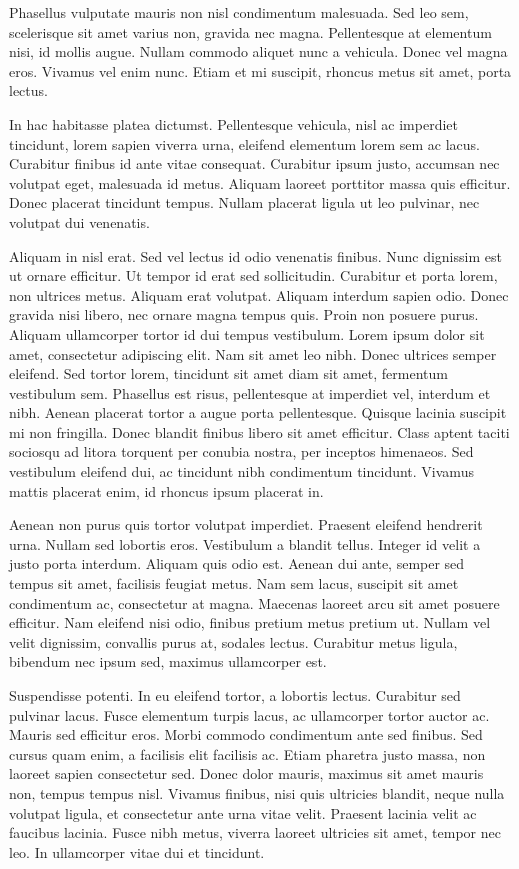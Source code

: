 \documentclass{article}
\begin{document}
Phasellus vulputate mauris non nisl condimentum malesuada. Sed leo sem, scelerisque sit amet varius non, gravida nec magna. Pellentesque at elementum nisi, id mollis augue. Nullam commodo aliquet nunc a vehicula. Donec vel magna eros. Vivamus vel enim nunc. Etiam et mi suscipit, rhoncus metus sit amet, porta lectus.

In hac habitasse platea dictumst. Pellentesque vehicula, nisl ac imperdiet tincidunt, lorem sapien viverra urna, eleifend elementum lorem sem ac lacus. Curabitur finibus id ante vitae consequat. Curabitur ipsum justo, accumsan nec volutpat eget, malesuada id metus. Aliquam laoreet porttitor massa quis efficitur. Donec placerat tincidunt tempus. Nullam placerat ligula ut leo pulvinar, nec volutpat dui venenatis.

Aliquam in nisl erat. Sed vel lectus id odio venenatis finibus. Nunc dignissim est ut ornare efficitur. Ut tempor id erat sed sollicitudin. Curabitur et porta lorem, non ultrices metus. Aliquam erat volutpat. Aliquam interdum sapien odio. Donec gravida nisi libero, nec ornare magna tempus quis. Proin non posuere purus. Aliquam ullamcorper tortor id dui tempus vestibulum. 
Lorem ipsum dolor sit amet, consectetur adipiscing elit. Nam sit amet leo nibh. Donec ultrices semper eleifend. Sed tortor lorem, tincidunt sit amet diam sit amet, fermentum vestibulum sem. Phasellus est risus, pellentesque at imperdiet vel, interdum et nibh. Aenean placerat tortor a augue porta pellentesque. Quisque lacinia suscipit mi non fringilla. Donec blandit finibus libero sit amet efficitur. Class aptent taciti sociosqu ad litora torquent per conubia nostra, per inceptos himenaeos. Sed vestibulum eleifend dui, ac tincidunt nibh condimentum tincidunt. Vivamus mattis placerat enim, id rhoncus ipsum placerat in.

Aenean non purus quis tortor volutpat imperdiet. Praesent eleifend hendrerit urna. Nullam sed lobortis eros. Vestibulum a blandit tellus. Integer id velit a justo porta interdum. Aliquam quis odio est. Aenean dui ante, semper sed tempus sit amet, facilisis feugiat metus. Nam sem lacus, suscipit sit amet condimentum ac, consectetur at magna. Maecenas laoreet arcu sit amet posuere efficitur. Nam eleifend nisi odio, finibus pretium metus pretium ut. Nullam vel velit dignissim, convallis purus at, sodales lectus. Curabitur metus ligula, bibendum nec ipsum sed, maximus ullamcorper est.

Suspendisse potenti. In eu eleifend tortor, a lobortis lectus. Curabitur sed pulvinar lacus. Fusce elementum turpis lacus, ac ullamcorper tortor auctor ac. Mauris sed efficitur eros. Morbi commodo condimentum ante sed finibus. Sed cursus quam enim, a facilisis elit facilisis ac. Etiam pharetra justo massa, non laoreet sapien consectetur sed. Donec dolor mauris, maximus sit amet mauris non, tempus tempus nisl. Vivamus finibus, nisi quis ultricies blandit, neque nulla volutpat ligula, et consectetur ante urna vitae velit. Praesent lacinia velit ac faucibus lacinia. Fusce nibh metus, viverra laoreet ultricies sit amet, tempor nec leo. In ullamcorper vitae dui et tincidunt.
\end{document}
